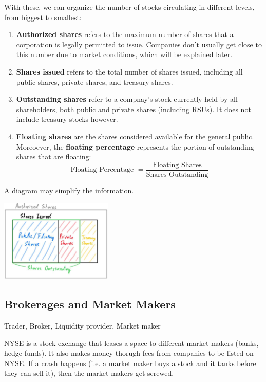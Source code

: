 \documentclass{article}
\begin{document}
    With these, we can organize the number of stocks circulating in different levels, from biggest to smallest: 
    \begin{enumerate}
      \item \textbf{Authorized shares} refers to the maximum number of shares that a corporation is legally permitted to issue. Companies don't usually get close to this number due to market conditions, which will be explained later. 
      \item \textbf{Shares issued} refers to the total number of shares issued, including all public shares, private shares, and treasury shares. 
      \item \textbf{Outstanding shares} refer to a compnay's stock currently held by all shareholders, both public and private shares (including RSUs). It does not include treasury stocks however. 
      \item \textbf{Floating shares} are the shares considered available for the general public. Moreoever, the \textbf{floating percentage} represents the portion of outstanding shares that are floating: 
        \[\text{Floating Percentage } = \frac{\text{Floating Shares}}{\text{Shares Outstanding}}\]
    \end{enumerate}
    A diagram may simplify the information. 
    \begin{center}
      \includegraphics[width=0.4\textwidth]{img/Shares_Outstanding.jpg}
    \end{center}

  \subsection{Brokerages and Market Makers}

    Trader, Broker, Liquidity provider, Market maker 

    NYSE is a stock exchange that leases a space to different market makers (banks, hedge funds). It also makes money thorugh fees from companies to be listed on NYSE. If a crash happens (i.e. a market maker buys a stock and it tanks before they can sell it), then the market makers get screwed. 
\end{document}
